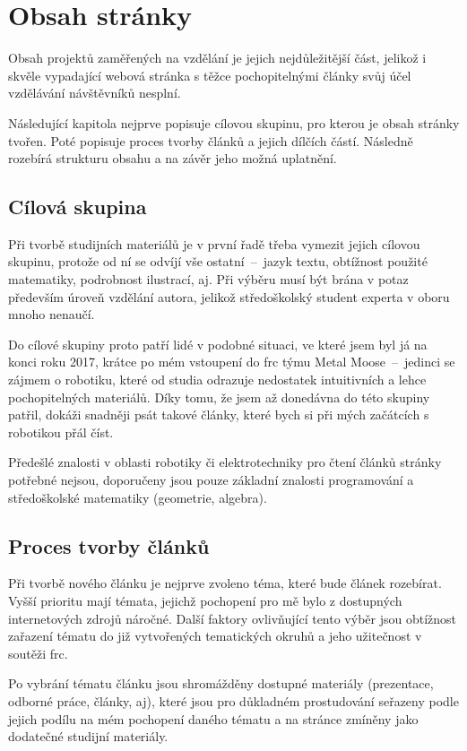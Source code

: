 \documentclass[a4paper, 12pt, twoside]{article}
\begin{document}
  \section{Obsah stránky}
  Obsah projektů zaměřených na vzdělání je jejich nejdůležitější část, jelikož i skvěle vypadající webová stránka s těžce pochopitelnými články svůj účel vzdělávání návštěvníků nesplní.

  Následující kapitola nejprve popisuje cílovou skupinu, pro kterou je obsah stránky tvořen. Poté popisuje proces tvorby článků a jejich dílčích částí. Následně rozebírá strukturu obsahu a na závěr jeho možná uplatnění.


  \subsection{Cílová skupina}
  Při tvorbě studijních materiálů je v první řadě třeba vymezit jejich cílovou skupinu, protože od ní se odvíjí vše ostatní~--~jazyk textu, obtížnost použité matematiky, podrobnost ilustrací, aj. Při výběru musí být brána v potaz především úroveň vzdělání autora, jelikož středoškolský student experta v oboru mnoho nenaučí.

  Do cílové skupiny proto patří lidé v podobné situaci, ve které jsem byl já na konci roku 2017, krátce po mém vstoupení do \gls{frc} týmu Metal Moose~--~jedinci se zájmem o robotiku, které od studia odrazuje nedostatek intuitivních a lehce pochopitelných materiálů. Díky tomu, že jsem až donedávna do této skupiny patřil, dokáži snadněji psát takové články, které bych si při mých začátcích s robotikou přál číst.

  Předešlé znalosti v oblasti robotiky či elektrotechniky pro čtení článků stránky potřebné nejsou, doporučeny jsou pouze základní znalosti programování a středoškolské matematiky (geometrie, algebra).


  \subsection{Proces tvorby článků} \label{sec:Proces tvorby článků}
  Při tvorbě nového článku je nejprve zvoleno téma, které bude článek rozebírat. Vyšší prioritu mají témata, jejichž pochopení pro mě bylo z dostupných internetových zdrojů náročné. Další faktory ovlivňující tento výběr jsou obtížnost zařazení tématu do již vytvořených tematických okruhů a jeho užitečnost v soutěži \gls{frc}.

  Po vybrání tématu článku jsou shromážděny dostupné materiály (prezentace, odborné práce, články, aj), které jsou pro důkladném prostudování seřazeny podle jejich podílu na mém pochopení daného tématu a na stránce zmíněny jako dodatečné studijní materiály.
\end{document}
